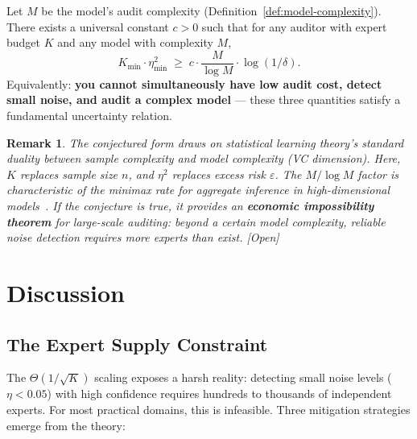 \documentclass[12pt,a4paper]{article}
\newtheorem{remark}[theorem]{Remark}
\newcommand{\openquest}{\textcolor{red!70!black}{\small\textsf{[Open]}}}
\begin{document}
\begin{conjecture}
\label{conj:duality}
Let $M$ be the model's audit complexity (Definition~\ref{def:model-complexity}).
There exists a universal constant $c>0$ such that for any auditor with expert
budget $K$ and any model with complexity $M$,
\begin{equation}\label{eq:duality}
    K_{\min} \cdot \eta_{\min}^2 \;\geq\;
    c \cdot \frac{M}{\log M} \cdot \log(1/\delta).
\end{equation}
Equivalently: \textbf{you cannot simultaneously have low audit cost, detect
small noise, and audit a complex model} — these three quantities satisfy a
fundamental uncertainty relation.
\end{conjecture}

\begin{remark}
The conjectured form draws on statistical learning theory's standard duality
between sample complexity and model complexity (VC dimension).  Here, $K$
replaces sample size $n$, and $\eta^2$ replaces excess risk $\varepsilon$.
The $M/\log M$ factor is characteristic of the minimax rate for aggregate
inference in high-dimensional models~\citep{wainwright2019high}.  If the
conjecture is true, it provides an \textbf{economic impossibility theorem}
for large-scale auditing: beyond a certain model complexity, reliable noise
detection requires more experts than exist.  \openquest
\end{remark}

\section{Discussion}

\subsection{The Expert Supply Constraint}

The $\Theta(1/\sqrt{K})$ scaling exposes a harsh reality: detecting small
noise levels ($\eta<0.05$) with high confidence requires hundreds to thousands
of independent experts.  For most practical domains, this is infeasible.
Three mitigation strategies emerge from the theory:
\end{document}
